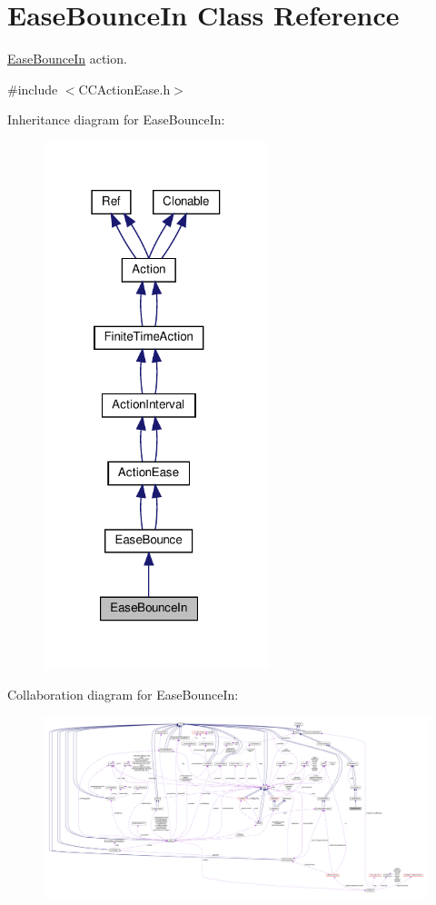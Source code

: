 \hypertarget{classEaseBounceIn}{}\section{Ease\+Bounce\+In Class Reference}
\label{classEaseBounceIn}


\hyperlink{classEaseBounceIn}{Ease\+Bounce\+In} action.  




{\ttfamily \#include $<$C\+C\+Action\+Ease.\+h$>$}



Inheritance diagram for Ease\+Bounce\+In\+:
\nopagebreak
\begin{figure}[H]
\begin{center}
\leavevmode
\includegraphics[width=186pt]{classEaseBounceIn__inherit__graph}
\end{center}
\end{figure}


Collaboration diagram for Ease\+Bounce\+In\+:
\nopagebreak
\begin{figure}[H]
\begin{center}
\leavevmode
\includegraphics[width=350pt]{classEaseBounceIn__coll__graph}
\end{center}
\end{figure}
